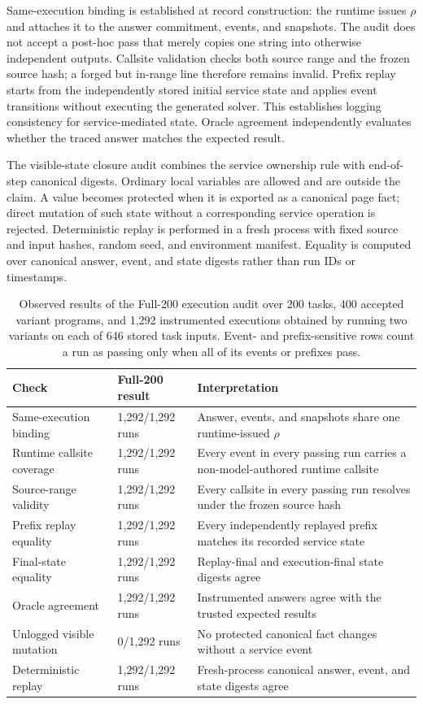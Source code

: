 \documentclass[letterpaper]{article}
\begin{document}
Same-execution binding is established at record construction: the
runtime issues $\rho$ and attaches it to the answer commitment, events,
and snapshots. The audit does not accept a post-hoc pass that merely
copies one string into otherwise independent outputs. Callsite
validation checks both source range and the frozen source hash; a forged
but in-range line therefore remains invalid. Prefix replay starts from
the independently stored initial service state and applies event
transitions without executing the generated solver. This establishes
logging consistency for service-mediated state. Oracle agreement
independently evaluates whether the traced answer matches the expected
result.

The visible-state closure audit combines the service ownership rule
with end-of-step canonical digests. Ordinary local variables are
allowed and are outside the claim. A value becomes protected when it is
exported as a canonical page fact; direct mutation of such state without
a corresponding service operation is rejected. Deterministic replay is
performed in a fresh process with fixed source and input hashes, random
seed, and environment manifest. Equality is computed over canonical
answer, event, and state digests rather than run IDs or timestamps.

\begin{table}[t]
\centering
\small
\setlength{\tabcolsep}{5pt}
\begin{tabular}{@{}p{}p{}p{}@{}}
\toprule
Check & Full-200 result & Interpretation \\
\midrule
Same-execution binding & 1,292/1,292 runs & Answer, events, and snapshots share one runtime-issued $\rho$ \\
Runtime callsite coverage & 1,292/1,292 runs & Every event in every passing run carries a non-model-authored runtime callsite \\
Source-range validity & 1,292/1,292 runs & Every callsite in every passing run resolves under the frozen source hash \\
Prefix replay equality & 1,292/1,292 runs & Every independently replayed prefix matches its recorded service state \\
Final-state equality & 1,292/1,292 runs & Replay-final and execution-final state digests agree \\
Oracle agreement & 1,292/1,292 runs & Instrumented answers agree with the trusted expected results \\
Unlogged visible mutation & 0/1,292 runs & No protected canonical fact changes without a service event \\
Deterministic replay & 1,292/1,292 runs & Fresh-process canonical answer, event, and state digests agree \\
\bottomrule
\end{tabular}
\caption{Observed results of the Full-200 execution audit over 200 tasks, 400 accepted variant programs, and 1,292 instrumented executions obtained by running two variants on each of 646 stored task inputs. Event- and prefix-sensitive rows count a run as passing only when all of its events or prefixes pass.}
\label{tab:single-execution-results}
\end{table}
\end{document}

